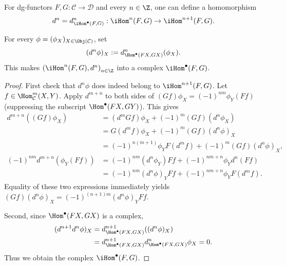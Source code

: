 \begin{definition-proposition}
	For dg-functors $F,G:\mathcal{C}\to\mathcal{D}$ and every $n\in\Z$, one
	can define a homomorphism
	\[ d^n = d^n_{\iHom^\bullet(F, G)}: \iHom^n(F, G) \to \iHom^{n+1}(F, G). \]

	For every $\phi=(\phi_X)_{X\in\Obj(\mathcal{C})}$, set
	\[ (d^n \phi)_X := d^n_{\Hom^\bullet(FX, GX)}(\phi_X). \]
	This makes $\left(\iHom^n(F,G),d^n\right)_{n\in\Z}$ into a complex
	$\iHom^\bullet(F,G)$.
\end{definition-proposition}
\begin{proof}
	First check that $d^n\phi$ does indeed belong to
	$\iHom^{n+1}(F,G)$. Let $f\in\Hom^m_{\mathcal{C}}(X,Y)$. Apply
	$d^{m+n}$ to both sides of
	$(Gf)\phi_X=(-1)^{nm}\phi_Y(Ff)$ (suppressing the subscript
	$\Hom^\bullet(FX,GY)$). This gives
	\begin{align*}
		d^{m+n}((Gf) \phi_X) & = (d^m Gf) \phi_X + (-1)^m (Gf) (d^n \phi_X) \\
		& = G (d^m f) \phi_X + (-1)^m (Gf) (d^n \phi)_X \\
		& = (-1)^{n(m+1)} \phi_Y F(d^m f) + (-1)^m (Gf) (d^n \phi)_X, \\
		(-1)^{nm} d^{m+n}(\phi_Y (Ff)) & = (-1)^{nm} (d^n \phi_Y) Ff + (-1)^{nm+n} \phi_Y d^n(Ff) \\
		& = (-1)^{nm} (d^n \phi)_Y Ff + (-1)^{nm+n} \phi_Y F(d^m f).
	\end{align*}
	Equality of these two expressions immediately yields
	$(Gf)(d^n\phi)_X=(-1)^{(n+1)m}(d^n\phi)_YFf$.

	Second, since $\Hom^\bullet(FX,GX)$ is a complex,
	\begin{align*}
		(d^{n+1} d^n \phi)_X & = d^{n+1}_{\Hom^\bullet(FX, GX)}((d^n \phi)_X) \\
		& = d^{n+1}_{\Hom^\bullet(FX, GX)} d^n_{\Hom^\bullet(FX, GX)} \phi_X = 0.
	\end{align*}
	Thus we obtain the complex $\iHom^\bullet(F,G)$.
\end{proof}


